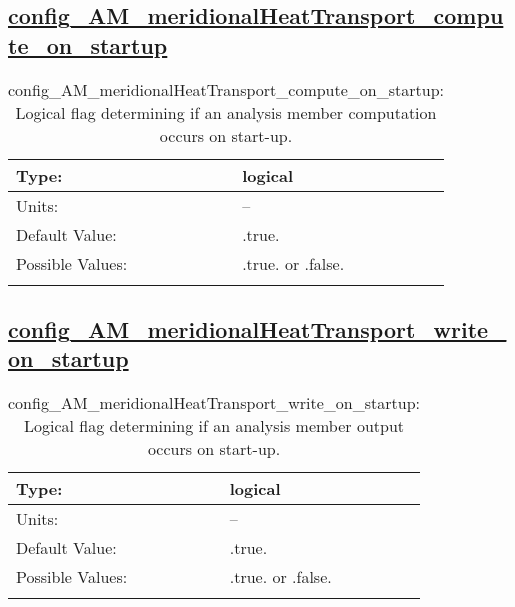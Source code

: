 \subsection[config\_AM\_meridionalHeatTransport\_compute\_on\_startup]{\hyperref[sec:nm_tab_AM_meridionalHeatTransport]{config\_AM\_meridionalHeatTransport\_compute\_on\_startup}}
\label{subsec:nm_sec_config_AM_meridionalHeatTransport_compute_on_startup}
\begin{center}
\begin{longtable}{| p{2.0in} || p{4.0in} |}
    \hline
    Type: & logical \\
    \hline
    Units: & -- \\
    \hline
    Default Value: & .true. \\
    \hline
    Possible Values: & .true. or .false. \\
    \hline
    \caption{config\_AM\_meridionalHeatTransport\_compute\_on\_startup: Logical flag determining if an analysis member computation occurs on start-up.}
\end{longtable}
\end{center}
\subsection[config\_AM\_meridionalHeatTransport\_write\_on\_startup]{\hyperref[sec:nm_tab_AM_meridionalHeatTransport]{config\_AM\_meridionalHeatTransport\_write\_on\_startup}}
\label{subsec:nm_sec_config_AM_meridionalHeatTransport_write_on_startup}
\begin{center}
\begin{longtable}{| p{2.0in} || p{4.0in} |}
    \hline
    Type: & logical \\
    \hline
    Units: & -- \\
    \hline
    Default Value: & .true. \\
    \hline
    Possible Values: & .true. or .false. \\
    \hline
    \caption{config\_AM\_meridionalHeatTransport\_write\_on\_startup: Logical flag determining if an analysis member output occurs on start-up.}
\end{longtable}
\end{center}
